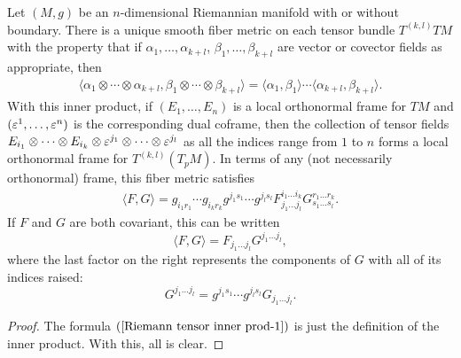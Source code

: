 \begin{proposition}
Let $(M,g)$ be an $n$-dimensional Riemannian manifold with or without 
boundary. There is a unique smooth fiber metric on each tensor bundle 
$T^{(k,l)}TM$ with the property that if $\alpha_1,\dots,\alpha_{k+l}$, 
$\beta_1,\dots,\beta_{k+l}$ are vector or covector fields as appropriate, 
then
\begin{align}\label{Riemann tensor inner prod-1}
\langle\alpha_1\otimes\cdots\otimes\alpha_{k+l},\beta_1\otimes\cdots\otimes\beta_{k+l}\rangle=\langle\alpha_{1},\beta_1\rangle\cdots\langle\alpha_{k+l},\beta_{k+l}\rangle.
\end{align}
With this inner product, if $(E_1,\dots,E_n)$ is a local orthonormal frame 
for $TM$ and $(\varepsilon^1,\dots,\varepsilon^n)$ is the corresponding dual coframe, 
then the collection of tensor fields $E_{i_1}\otimes\cdots\otimes E_{i_k}\otimes\varepsilon^{j_1}\otimes\cdots\otimes\varepsilon^{j_l}$ 
as all the indices range from $1$ to $n$ forms a local orthonormal frame 
for $T^{(k,l)}(T_pM)$. In terms of any (not necessarily orthonormal) frame, 
this fiber metric satisfies
\begin{align}\label{Riemann tensor inner prod-2}
\langle F,G\rangle=g_{i_1r_1}\cdots g_{i_kr_k}g^{j_1s_1}\cdots g^{j_ls_l}F^{i_1\dots i_k}_{j_1\dots j_l}G^{r_1\dots r_k}_{s_1\dots s_l}.
\end{align}
If $F$ and $G$ are both covariant, this can be written
\[\langle F,G\rangle=F_{j_1\dots j_l}G^{j_1\dots j_l},\]
where the last factor on the right represents the components of $G$ with 
all of its indices raised:
\[G^{j_1\dots j_l}=g^{j_1s_1}\cdots g^{j_ls_l}G_{j_1\dots j_l}.\]
\end{proposition}
\begin{proof}
The formula $(\ref{Riemann tensor inner prod-1})$ is just the definition of the inner product. With this, all is clear.
\end{proof}

